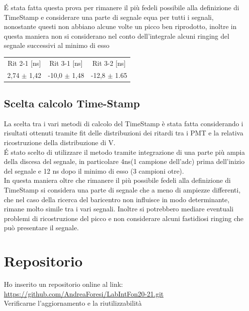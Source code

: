 \documentclass[a4paper]{article}
\begin{document}
\'E stata fatta questa prova per rimanere il più fedeli possibile alla definizione di TimeStamp e considerare una parte di segnale equa per tutti i segnali, nonostante questi non abbiano alcune volte un picco ben riprodotto, inoltre in questa maniera non si considerano nel conto dell'integrale alcuni ringing del segnale successivi al minimo di esso 

\begin{tabular}{c|c|c}
Rit 2-1 [ns] & Rit 3-1 [ns] & Rit 3-2 [ns] \\
\hfill
2,74 $\pm$ 1,42 & -10,0 $\pm$ 1,48 & -12,8 $\pm$ 1.65
\hfill
\label{tab:RitForeA}
\end{tabular}



\subsection{Scelta calcolo Time-Stamp}
\label{secA:Scelta}
La scelta tra i vari metodi di calcolo del TimeStamp è stata fatta considerando i risultati ottenuti tramite fit delle distribuzioni dei ritardi tra i PMT e la relativa ricostruzione della distribuzione di V.\\
\'E stato scelto di utilizzare il metodo tramite integrazione di una parte più ampia della discesa del segnale, in particolare 4ns(1 campione dell'adc) prima dell'inizio del segnale e 12 ns dopo il minimo di esso (3 campioni otre).\\
In questa maniera oltre che rimanere il più possibile fedeli alla definizione di TimeStamp si considera una parte di segnale che a meno di ampiezze differenti, che nel caso della ricerca del baricentro non influisce in modo determinante, rimane molto simile tra i vari segnali. Inoltre si potrebbero mediare eventuali problemi di ricostruzione del picco e non considerare alcuni fastidiosi ringing che può presentare il segnale.

\section*{Repositorio}
Ho inserito un repositorio online al link:\\
\url{https://github.com/AndreaForesi/LabIntFon20-21.git}\\
Verificarne l'aggiornamento e la riutilizzabilità
\end{document}
